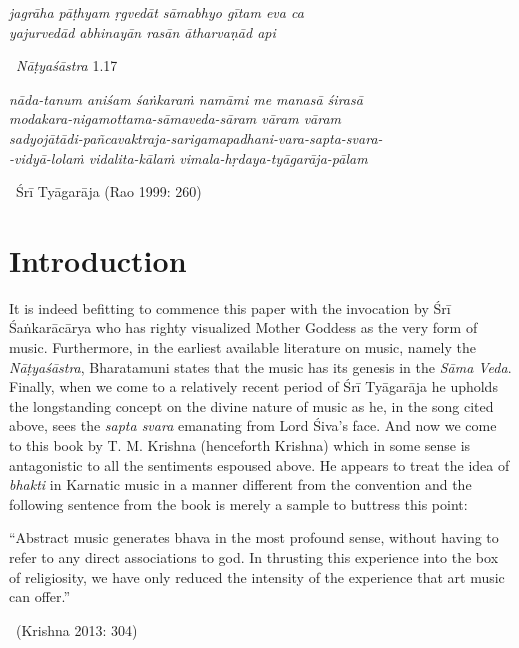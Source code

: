 \begin{myquote}
\textit{jagrāha pāṭhyam ṛgvedāt sāmabhyo gītam eva ca }\\ \textit{yajurvedād abhinayān rasān ātharvaṇād api } 

~\hfill \textit{Nāṭyaśāstra} 1.17
\end{myquote}

\begin{myquote}
\textit{nāda-tanum aniśam śaṅkaraṁ namāmi me manasā śirasā}\\ \textit{modakara-nigamottama-sāmaveda-sāram vāram vāram}\\ \textit{sadyojātādi-pañcavaktraja-sarigamapadhani-vara-sapta-svara-}\\ \textit{-vidyā-lolaṁ vidalita-kālaṁ vimala-hṛdaya-tyāgarāja-pālam} 

~\hfill Śrī Tyāgarāja (Rao 1999: 260)
\end{myquote}

\vspace{-.4cm}

\section*{Introduction}

It is indeed befitting to commence this paper with the invocation by Śrī Śaṅkarācārya who has righty visualized Mother Goddess as the very form of music. Furthermore, in the earliest available literature on music, namely the \textit{Nāṭyaśāstra}, Bharatamuni states that the music has its genesis in the \textit{Sāma Veda}. Finally, when we come to a relatively recent period of Śrī Tyāgarāja he upholds the longstanding concept on the divine nature of music as he, in the song cited above, sees the \textit{sapta svara} emanating from Lord Śiva’s face. And now we come to this book by T. M. Krishna (henceforth Krishna) which in some sense is antagonistic to all the sentiments espoused above. He appears to treat the idea of \textit{bhakti} in Karnatic music in a manner different from the convention and the following sentence from the book is merely a sample to buttress this point:

\begin{myquote}
“Abstract music generates bhava in the most profound sense, without having to refer to any direct associations to god. In thrusting this experience into the box of religiosity, we have only reduced the intensity of the experience that art music can offer.” 

~\hfill (Krishna 2013: 304)
\end{myquote}

